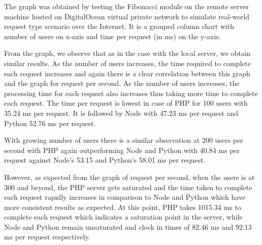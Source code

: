 \documentclass[../thesis.tex]{subfiles}
\begin{document}
\newpage
The graph was obtained by testing the Fibonacci module on the remote server machine hosted on DigitalOcean virtual private network to simulate real-world request type scenario over the Internet. It is a grouped column chart with number of users on x-axis and time per request (in ms) on the y-axis.
\newline

From the graph, we observe that as in the case with the local server, we obtain similar results. As the number of users increases, the time required to complete each request increases and again there is a clear correlation between this graph and the graph for request per second. As the number of users increases, the processing time for each request also increases thus taking more time to complete each request. The time per request is lowest in case of PHP for 100 users with 35.24 ms per request. It is followed by Node with 47.23 ms per request and Python 52.76 ms per request.
\newline

With growing number of users there is a similar observation at 200 users per second with PHP again outperforming Node and Python with 40.84 ms per request against Node's 53.15 and Python's 58.01 ms per request.
\newline

However, as expected from the graph of request per second, when the users is at 300 and beyond, the PHP server gets saturated and the time taken to complete each request rapidly increases in comparison to Node and Python which have more consistent results as expected. At this point, PHP takes 1015.34 ms to complete each request which indicates a saturation point in the server, while Node and Python remain unsaturated and clock in times of 82.46 ms and 92.13 ms per request respectively.
\newline
\end{document}
